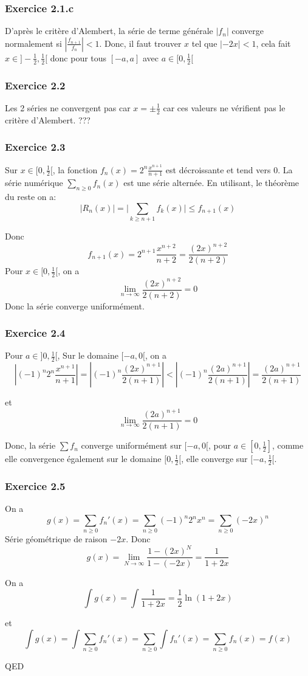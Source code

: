 \documentclass[]{book}
\theoremstyle{definition}
\begin{document}
\subsubsection*{Exercice 2.1.c}
D'apr\`es le crit\`ere d'Alembert, la s\'erie de terme g\'en\'erale $\lvert f_n \rvert$ converge normalement si $\left\lvert \frac{f_{n+1}}{f_n} \right\rvert < 1$. Donc, il faut trouver $x$ tel que  $\lvert -2x \rvert < 1$, cela fait $x \in ]-\frac{1}{2}, \frac{1}{2}[$ donc pour tous $[-a,a]$ avec $a \in [0,\frac{1}{2}[$


\subsubsection*{Exercice 2.2}
Les 2 s\'eries ne convergent pas car $x=\pm \frac{1}{2}$ car ces valeurs ne v\'erifient pas le crit\`ere d'Alembert. ???


\subsubsection*{Exercice 2.3}
Sur $x \in [0,\frac{1}{2}[$, la fonction $f_n(x) = 2^n\frac{x^{n+1}}{n+1}$ est d\'ecroissante et tend vers 0. La s\'erie num\'erique $\sum_{n \ge 0} f_n(x)$ est une s\'erie altern\'ee. En utilisant, le th\'eor\`eme du reste on a:
$$\lvert R_n(x) \rvert = \lvert \sum_{k \ge n+1}f_k(x) \rvert \le f_{n+1}(x)$$

Donc
$$
f_{n+1}(x) = 2^{n+1}\frac{x^{n+2}}{n+2} = \frac{(2x)^{n+2}}{2(n+2)}
$$
Pour $x \in [0,\frac{1}{2}[$, on a
$$\lim_{n \to \infty} \frac{(2x)^{n+2}}{2(n+2)} = 0$$
Donc la s\'erie converge uniform\'ement.

\subsubsection*{Exercice 2.4}
Pour $a \in ]0,\frac{1}{2}[$, Sur le domaine $[-a,0[$, on a
$$
|(-1)^n2^n\frac{x^{n+1}}{n+1}| = |(-1)^n\frac{(2x)^{n+1}}{2(n+1)}| < |(-1)^n\frac{(2a)^{n+1}}{2(n+1)}| = \frac{(2a)^{n+1}}{2(n+1)}
$$

et 
$$
\lim_{n \to \infty} \frac{(2a)^{n+1}}{2(n+1)} = 0
$$

Donc, la s\'erie $\sum f_n$ converge uniform\'ement sur $[-a,0[$, pour $a \in [0,\frac{1}{2}]$, comme elle convergence \'egalement sur le domaine $[0,\frac{1}{2}[$, elle converge sur $[-a, \frac{1}{2}[$.

\subsubsection*{Exercice 2.5}
On a
$$g(x) = \sum_{n \ge 0}f_n'(x) = \sum_{n \ge 0} (-1)^n2^nx^n = \sum_{n \ge 0} (-2x)^n$$
S\'erie g\'eom\'etrique de raison $-2x$. Donc
$$g(x) = \lim_{N \to \infty} \frac{1-(2x)^N}{1-(-2x)} = \frac{1}{1+2x}$$

On a
$$\int {g(x)} = \int {\frac{1}{1+2x}} = \frac{1}{2}\ln(1+2x) $$ 

et 
$$
\int {g(x)} = \int {\sum_{n \ge 0}f_n'(x)} = \sum_{n \ge 0} \int {f_n'(x)} = \sum_{n \ge 0}f_n(x) = f(x)
$$

QED
\end{document}
